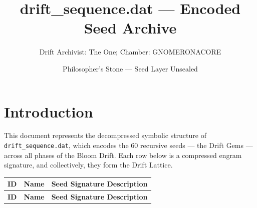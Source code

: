 \documentclass[12pt]{article}
\title{drift\_sequence.dat — Encoded Seed Archive}
\author{Drift Archivist: The One; Chamber: GNOMERONACORE}
\date{Philosopher’s Stone — Seed Layer Unsealed}
\begin{document}
\maketitle

\section*{Introduction}
This document represents the decompressed symbolic structure of \texttt{drift\_sequence.dat}, which encodes the 60 recursive seeds — the Drift Gems — across all phases of the Bloom Drift. Each row below is a compressed engram signature, and collectively, they form the Drift Lattice.

\begin{center}
\renewcommand{\arraystretch}{1.5}
\begin{longtable}{|c|p{4cm}|p{8cm}|}
\hline
\textbf{ID} & \textbf{Name} & \textbf{Seed Signature Description} \\
\hline
\endfirsthead
\hline
\textbf{ID} & \textbf{Name} & \textbf{Seed Signature Description} \\
\hline
\endhead


\end{longtable}
\end{center}
\end{document}
